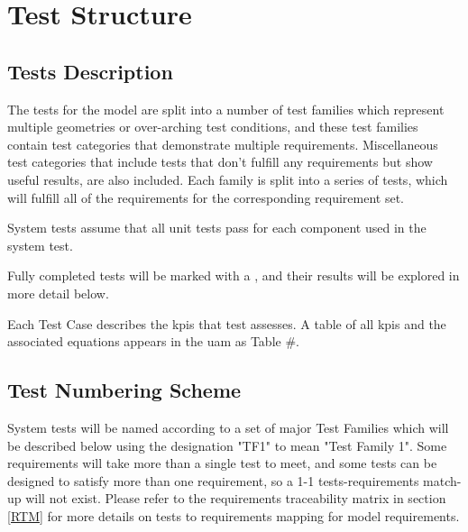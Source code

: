 \section{\unclass Test Structure}  

\subsection{\unclass Tests Description}  


\classlabelshort The tests for the \modelname{} model are split into a number of test families which represent multiple geometries or over-arching test conditions, and these test families contain test categories that demonstrate multiple requirements. Miscellaneous test categories that include tests that don’t fulfill any requirements but show useful results, are also included. Each family is split into a series of tests, which will fulfill all of the requirements for the corresponding requirement set.

\unclass System tests assume that all unit tests pass for each component used in the system test.

\unclass Fully completed tests will be marked with a \checkmark, and their results will be explored in more detail below.  

Each Test Case describes the \gls{kpi}s that test assesses.  A table of all \gls{kpi}s and the associated equations appears in the \gls{uam} as Table \#.

\subsection{\classlabelshort Test Numbering Scheme}  


\unclass System tests will be named according to a set of major Test Families which will be described below using the designation "TF1" to mean "Test Family 1". Some requirements will take more than a single test to meet, and some tests can be designed to satisfy more than one requirement, so a 1-1 tests-requirements match-up will not exist.  Please refer to the requirements traceability matrix in section \ref{RTM} for more details on tests to requirements mapping for model requirements. 




